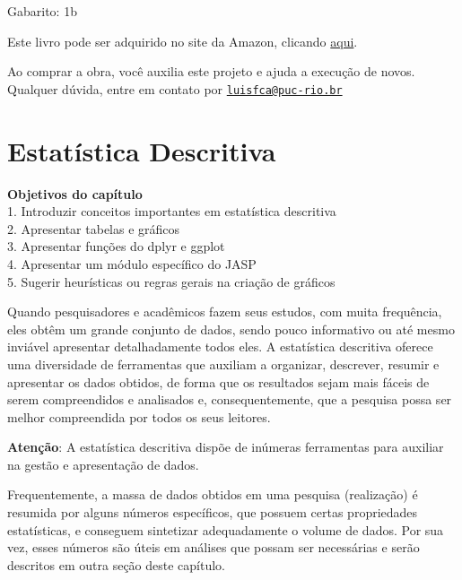 \documentclass[
]{book}
\newenvironment{objectives}{
  \definecolor{shadecolor}{rgb}{0, 0, 0}  %
  \color{white}
  \begin{shaded}}
 {\end{shaded}}
\begin{document}
Gabarito: 1b

Este livro pode ser adquirido no site da Amazon, clicando \href{https://www.amazon.com.br/gp/product/B097CP7T9M?pf_rd_r=RDZC8XYMBC1WY69T0J8K\&pf_rd_p=abb22e6b-8812-4b76-a424-5f0b098d2c90\&pd_rd_r=ceec1911-f409-4acd-ac8f-2d5bc68dac43\&pd_rd_w=wMUzJ\&pd_rd_wg=ZK85a\&ref_=pd_gw_unk}{aqui}.

Ao comprar a obra, você auxilia este projeto e ajuda a execução de novos. Qualquer dúvida, entre em contato por \href{mailto:luisfca@puc-rio.br}{\nolinkurl{luisfca@puc-rio.br}}

\hypertarget{estatuxedstica-descritiva}{%
\chapter{Estatística Descritiva}\label{estatuxedstica-descritiva}}

\begin{objectives}
\textbf{Objetivos do capítulo}\\
1. Introduzir conceitos importantes em estatística descritiva\\
2. Apresentar tabelas e gráficos\\
3. Apresentar funções do dplyr e ggplot\\
4. Apresentar um módulo específico do JASP\\
5. Sugerir heurísticas ou regras gerais na criação de gráficos

\end{objectives}

Quando pesquisadores e acadêmicos fazem seus estudos, com muita frequência, eles obtêm um grande conjunto de dados, sendo pouco informativo ou até mesmo inviável apresentar detalhadamente todos eles. A estatística descritiva oferece uma diversidade de ferramentas que auxiliam a organizar, descrever, resumir e apresentar os dados obtidos, de forma que os resultados sejam mais fáceis de serem compreendidos e analisados e, consequentemente, que a pesquisa possa ser melhor compreendida por todos os seus leitores.

\textbf{Atenção}: A estatística descritiva dispõe de inúmeras ferramentas para auxiliar na gestão e apresentação de dados.

Frequentemente, a massa de dados obtidos em uma pesquisa (realização) é resumida por alguns números específicos, que possuem certas propriedades estatísticas, e conseguem sintetizar adequadamente o volume de dados. Por sua vez, esses números são úteis em análises que possam ser necessárias e serão descritos em outra seção deste capítulo.
\end{document}
